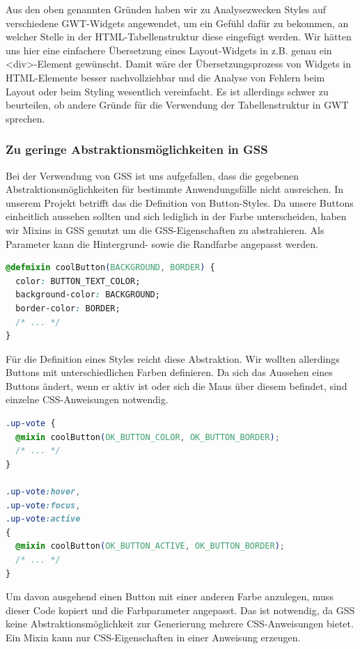 Aus den oben genannten Gründen haben wir zu Analysezwecken Styles auf verschiedene GWT-Widgets angewendet,
um ein Gefühl dafür zu bekommen, an welcher Stelle in der HTML-Tabellenstruktur diese eingefügt werden.
Wir hätten uns hier eine einfachere Übersetzung eines Layout-Widgets in z.B. genau ein <div>-Element gewünscht.
Damit wäre der Übersetzungsprozess von Widgets in HTML-Elemente besser nachvollziehbar 
und die Analyse von Fehlern beim Layout oder beim Styling wesentlich vereinfacht.
Es ist allerdings schwer zu beurteilen, ob andere Gründe für die Verwendung der Tabellenstruktur in GWT sprechen.
 
\subsubsection{Zu geringe Abstraktionsmöglichkeiten in GSS}

Bei der Verwendung von GSS ist uns aufgefallen, dass die gegebenen Abstraktionsmöglichkeiten
für bestimmte Anwendungsfälle nicht ausreichen. In unserem Projekt betrifft das die Definition
von Button-Styles.
Da unsere Buttons einheitlich aussehen sollten und sich lediglich in der Farbe unterscheiden, 
haben wir Mixins in GSS genutzt um die GSS-Eigenschaften zu abstrahieren. Als Parameter kann
die Hintergrund- sowie die Randfarbe angepasst werden.

\begin{lstlisting}[language=CSS]
@defmixin coolButton(BACKGROUND, BORDER) {
  color: BUTTON_TEXT_COLOR; 
  background-color: BACKGROUND; 
  border-color: BORDER; 
  /* ... */
}
\end{lstlisting}

Für die Definition eines Styles reicht diese Abstraktion. Wir wollten allerdings Buttons mit unterschiedlichen Farben definieren. Da sich das Aussehen eines Buttons ändert, wenn er aktiv ist oder sich
die Maus über diesem befindet, sind einzelne CSS-Anweisungen notwendig.

\begin{lstlisting}[language=CSS]
.up-vote { 
  @mixin coolButton(OK_BUTTON_COLOR, OK_BUTTON_BORDER);
  /* ... */
} 

.up-vote:hover, 
.up-vote:focus, 
.up-vote:active
{ 
  @mixin coolButton(OK_BUTTON_ACTIVE, OK_BUTTON_BORDER);
  /* ... */
} 
\end{lstlisting}

Um davon ausgehend einen Button mit einer anderen Farbe anzulegen, muss dieser Code kopiert und
die Farbparameter angepasst.
Das ist notwendig, da GSS keine Abstraktionsmöglichkeit zur Generierung mehrere CSS-Anweisungen
bietet. Ein Mixin kann nur CSS-Eigenschaften in einer Anweisung erzeugen.

